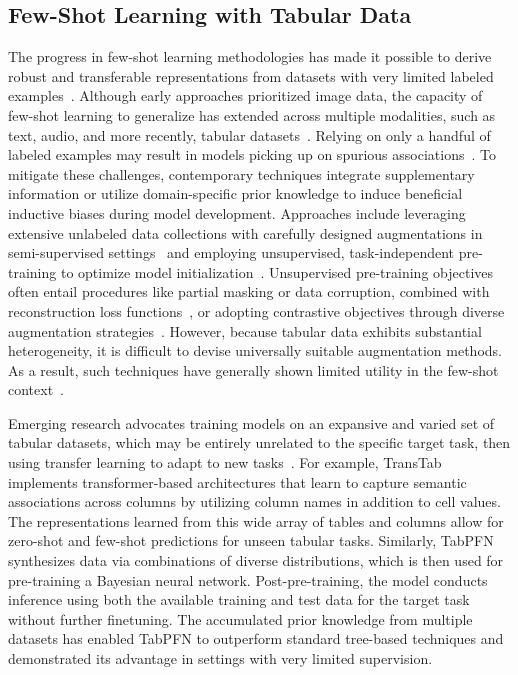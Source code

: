 \subsection{Few-Shot Learning with Tabular Data} The progress in few-shot learning methodologies has made it possible to derive robust and transferable representations from datasets with very limited labeled examples~\cite{chen2018closer}. Although early approaches prioritized image data, the capacity of few-shot learning to generalize has extended across multiple modalities, such as text, audio, and more recently, tabular datasets~\cite{majumder2022few,nam2023stunt,schick2021exploiting}. Relying on only a handful of labeled examples may result in models picking up on spurious associations~\cite{bartlett2021deep}. To mitigate these challenges, contemporary techniques integrate supplementary information or utilize domain-specific prior knowledge to induce beneficial inductive biases during model development. Approaches include leveraging extensive unlabeled data collections with carefully designed augmentations in semi-supervised settings~\cite{ucar2021subtab,yoon2020vime} and employing unsupervised, task-independent pre-training to optimize model initialization~\cite{somepalli2021saint}. Unsupervised pre-training objectives often entail procedures like partial masking or data corruption, combined with reconstruction loss functions~\cite{arik2021tabnet,majmundar2022met}, or adopting contrastive objectives through diverse augmentation strategies~\cite{bahri2022scarf,chen2020simple}. However, because tabular data exhibits substantial heterogeneity, it is difficult to devise universally suitable augmentation methods. As a result, such techniques have generally shown limited utility in the few-shot context~\cite{nam2023stunt}.

Emerging research advocates training models on an expansive and varied set of tabular datasets, which may be entirely unrelated to the specific target task, then using transfer learning to adapt to new tasks~\cite{zhang2023generative,levin2022transfer,zhu2023xtab}. For example, TransTab~\cite{wang2022transtab} implements transformer-based architectures that learn to capture semantic associations across columns by utilizing column names in addition to cell values. The representations learned from this wide array of tables and columns allow for zero-shot and few-shot predictions for unseen tabular tasks. Similarly, TabPFN~\cite{hollmann2022tabpfn} synthesizes data via combinations of diverse distributions, which is then used for pre-training a Bayesian neural network. Post-pre-training, the model conducts inference using both the available training and test data for the target task without further finetuning. The accumulated prior knowledge from multiple datasets has enabled TabPFN to outperform standard tree-based techniques and demonstrated its advantage in settings with very limited supervision.

